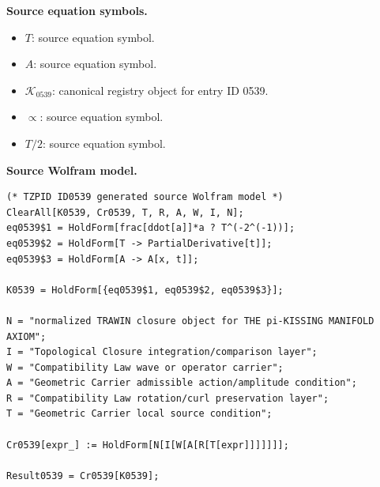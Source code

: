 \begin{minipage}[t]{0.49\linewidth}
\begingroup
\small
\raggedright
\textbf{Source equation symbols.}\par
\begin{itemize}[leftmargin=1.35em,itemsep=1pt,topsep=1pt,parsep=0pt]
    \item $T$: source equation symbol.
    \item $A$: source equation symbol.
    \item $\mathcal{K}_{0539}$: canonical registry object for entry ID 0539.
    \item $\propto$: source equation symbol.
    \item $T/2$: source equation symbol.
\end{itemize}
\endgroup
\end{minipage}\hfill
\begin{minipage}[t]{0.47\linewidth}
\begingroup
\scriptsize
\raggedright
\textbf{Source Wolfram model.}\par
\begin{Verbatim}[fontsize=\tiny,breaklines=true,breakanywhere=true]
(* TZPID ID0539 generated source Wolfram model *)
ClearAll[K0539, Cr0539, T, R, A, W, I, N];
eq0539$1 = HoldForm[frac[ddot[a]]*a ? T^(-2^(-1))];
eq0539$2 = HoldForm[T -> PartialDerivative[t]];
eq0539$3 = HoldForm[A -> A[x, t]];

K0539 = HoldForm[{eq0539$1, eq0539$2, eq0539$3}];

N = "normalized TRAWIN closure object for THE pi-KISSING MANIFOLD AXIOM";
I = "Topological Closure integration/comparison layer";
W = "Compatibility Law wave or operator carrier";
A = "Geometric Carrier admissible action/amplitude condition";
R = "Compatibility Law rotation/curl preservation layer";
T = "Geometric Carrier local source condition";

Cr0539[expr_] := HoldForm[N[I[W[A[R[T[expr]]]]]]];

Result0539 = Cr0539[K0539];
\end{Verbatim}
\endgroup
\end{minipage}

